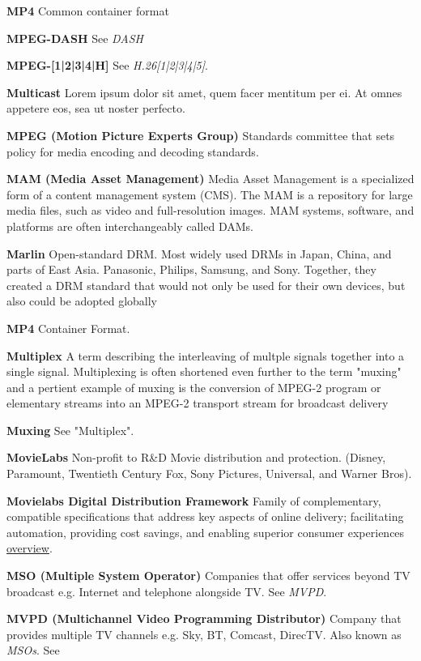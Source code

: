 \smallskip
\textbf{MP4}
Common container format

\smallskip
\textbf{MPEG-DASH}
See \textit{DASH}

\smallskip
\textbf{MPEG-[1|2|3|4|H]}
See \textit{H.26[1|2|3|4|5]}.

\smallskip
\textbf{Multicast}
Lorem ipsum dolor sit amet, quem facer mentitum per ei. At omnes appetere eos, sea ut noster perfecto.

\smallskip
\textbf{MPEG (Motion Picture Experts Group)}
Standards committee that sets policy for media encoding and decoding standards.

\smallskip
\textbf{MAM (Media Asset Management)}
Media Asset Management is a specialized form of a content management system (CMS). The MAM is a repository for large media files, such as video and full-resolution images. MAM systems, software, and platforms are often interchangeably called DAMs.

\smallskip
\textbf{Marlin}
Open-standard DRM. Most widely used DRMs in Japan, China, and parts of East Asia. Panasonic, Philips, Samsung, and Sony. Together, they created a DRM standard that would not only be used for their own devices, but also could be adopted globally

\smallskip
\textbf{MP4}
Container Format.

\smallskip
\textbf{Multiplex}
A term describing the interleaving of multple signals together into a single signal. Multiplexing is often shortened even further to the term "muxing" and a pertient example of muxing is the conversion of MPEG-2 program or elementary streams into an MPEG-2 transport stream for broadcast delivery

\smallskip
\textbf{Muxing}
See "Multiplex".

\smallskip
\textbf{MovieLabs}
Non-profit to R\&D Movie distribution and protection. (Disney, Paramount, Twentieth Century Fox, Sony Pictures, Universal, and Warner Bros).

\smallskip
\textbf{Movielabs Digital Distribution Framework}
Family of complementary, compatible specifications that address key aspects of online delivery; facilitating automation, providing cost savings, and enabling superior consumer experiences \href{https://movielabs.com/md/}{overview}.

\smallskip
\textbf{MSO (Multiple System Operator)}
Companies that offer services beyond TV broadcast e.g. Internet and telephone alongside TV.  See \textit{MVPD}.


\smallskip
\textbf{MVPD (Multichannel Video Programming Distributor)}
Company that provides multiple TV channels e.g. Sky, BT, Comcast, DirecTV. Also known as \textit{MSOs}. See

